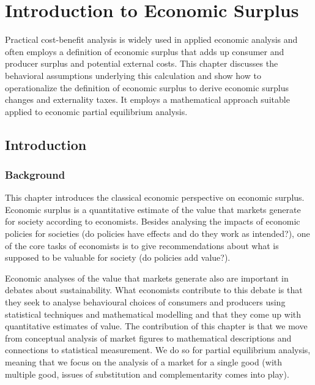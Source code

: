 \documentclass[
]{book}
\begin{document}
\hypertarget{surplus}{%
\chapter{Introduction to Economic Surplus}\label{surplus}}

Practical cost-benefit analysis is widely used in applied economic analysis and often employs a definition of economic surplus that adds up consumer and producer surplus and potential external costs. This chapter discusses the behavioral assumptions underlying this calculation and show how to operationalize the definition of economic surplus to derive economic surplus changes and externality taxes. It employs a mathematical approach suitable applied to economic partial equilibrium analysis.

\hypertarget{introduction-1}{%
\section{Introduction}\label{introduction-1}}

\hypertarget{background}{%
\subsection{Background}\label{background}}

This chapter introduces the classical economic perspective on economic surplus. Economic surplus is a quantitative estimate of the value that markets generate for society according to economists. Besides analysing the impacts of economic policies for societies (do policies have effects and do they work as intended?), one of the core tasks of economists is to give recommendations about what is supposed to be valuable for society (do policies add value?).

Economic analyses of the value that markets generate also are important in debates about sustainability. What economists contribute to this debate is that they seek to analyse behavioural choices of consumers and producers using statistical techniques and mathematical modelling and that they come up with quantitative estimates of value. The contribution of this chapter is that we move from conceptual analysis of market figures to mathematical descriptions and connections to statistical measurement. We do so for partial equilibrium analysis, meaning that we focus on the analysis of a market for a single good (with multiple good, issues of substitution and complementarity comes into play).
\end{document}
